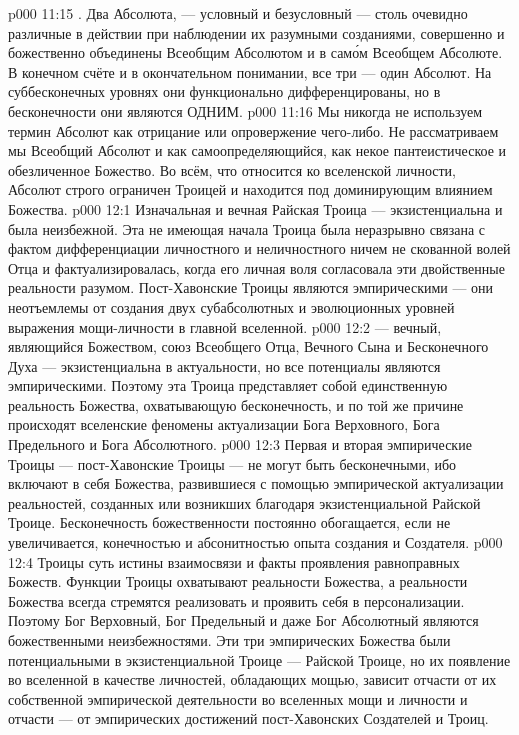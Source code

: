 \vs p000 11:15 \pc {}. Два Абсолюта, --- условный и безусловный --- столь очевидно различные в действии при наблюдении их разумными созданиями, совершенно и божественно объединены Всеобщим Абсолютом и в сам\'ом Всеобщем Абсолюте. В конечном счёте и в окончательном понимании, все три --- один Абсолют. На суббесконечных уровнях они функционально дифференцированы, но в бесконечности они являются ОДНИМ.
\vs p000 11:16 \pc Мы никогда не используем термин Абсолют как отрицание или опровержение чего\hyp{}либо. Не рассматриваем мы Всеобщий Абсолют и как самоопределяющийся, как некое пантеистическое и обезличенное Божество. Во всём, что относится ко вселенской личности, Абсолют строго ограничен Троицей и находится под доминирующим влиянием Божества.
\vs p000 12:1 Изначальная и вечная Райская Троица --- экзистенциальна и была неизбежной. Эта не имеющая начала Троица была неразрывно связана с фактом дифференциации личностного и неличностного ничем не скованной волей Отца и фактуализировалась, когда его личная воля согласовала эти двойственные реальности разумом. Пост\hyp{}Хавонские Троицы являются эмпирическими --- они неотъемлемы от создания двух субабсолютных и эволюционных уровней выражения мощи\hyp{}личности в главной вселенной.
\vs p000 12:2 \pc {} --- вечный, являющийся Божеством, союз Всеобщего Отца, Вечного Сына и Бесконечного Духа --- экзистенциальна в актуальности, но все потенциалы являются эмпирическими. Поэтому эта Троица представляет собой единственную реальность Божества, охватывающую бесконечность, и по той же причине происходят вселенские феномены актуализации Бога Верховного, Бога Предельного и Бога Абсолютного.
\vs p000 12:3 \pc Первая и вторая эмпирические Троицы --- пост\hyp{}Хавонские Троицы --- не могут быть бесконечными, ибо включают в себя  Божества, развившиеся с помощью эмпирической актуализации реальностей, созданных или возникших благодаря экзистенциальной Райской Троице. Бесконечность божественности постоянно обогащается, если не увеличивается, конечностью и абсонитностью опыта создания и Создателя.
\vs p000 12:4 Троицы суть истины взаимосвязи и факты проявления равноправных Божеств. Функции Троицы охватывают реальности Божества, а реальности Божества всегда стремятся реализовать и проявить себя в персонализации. Поэтому Бог Верховный, Бог Предельный и даже Бог Абсолютный являются божественными неизбежностями. Эти три эмпирических Божества были потенциальными в экзистенциальной Троице --- Райской Троице, но их появление во вселенной в качестве личностей, обладающих мощью, зависит отчасти от их собственной эмпирической деятельности во вселенных мощи и личности и отчасти --- от эмпирических достижений пост\hyp{}Хавонских Создателей и Троиц.

